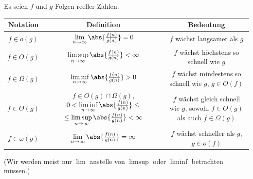 \begin{questions}
	\clearpage
	\noindent
	Es seien $f$ und $g$ Folgen reeller Zahlen.\\
	\vspace{0.5cm}
	\centering
	\small
	\begin{tabular}{|c|c|c|}
		\hline
		\textbf{Notation} & \textbf{Definition}                                              & \textbf{Bedeutung}                                  \\
		\hline
		$f \in o(g)$      & $\lim\limits_{n \to \infty} \abs{\frac{f(n)}{g(n)}} = 0$         & $f$ wächst langsamer als $g$                        \\
		\hline
		$f \in O(g)$      & $\limsup\limits_{n \to \infty} \abs{\frac{f(n)}{g(n)}} < \infty$ & $f$ wächst höchstens so schnell wie $g$             \\
		\hline
		$f \in \Omega(g)$ & $\liminf\limits_{n \to \infty} \abs{\frac{f(n)}{g(n)}} > 0$      & \makecell{$f$ wächst mindestens so schnell wie $g$, \\$g\in O(f)$}                          \\
		\hline
		$f \in \Theta(g)$ & \makecell{$f \in O(g)\cap \Omega(g)$,                                                                                  \\ $0 < \liminf\limits_{n \to \infty} \abs{\frac{f(n)}{g(n)}} \leq$ \\ $\leq\limsup\limits_{n \to \infty} \abs{\frac{f(n)}{g(n)}} < \infty$} & \makecell{$f$ wächst gleich schnell wie $g$,        \\sowohl $f\in O(g)$ als auch $f\in\Omega(g)$} \\
		\hline
		$f \in \omega(g)$ & $\lim\limits_{n \to \infty} \abs{\frac{f(n)}{g(n)}} = \infty$    & \makecell{$f$ wächst schneller als $g$,             \\$g\in o(f)$}                                      \\
		\hline
	\end{tabular}

	(Wir werden meist nur $\lim$ anstelle von $\limsup$ oder $\liminf$ betrachten müssen.)
\end{questions}
